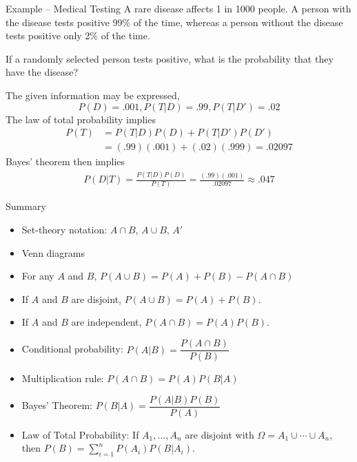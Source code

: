 \documentclass[xcolor=table]{beamer}
\begin{document}
\begin{frame}{Example -- Medical Testing}
A rare disease affects 1 in 1000 people. A person with the disease tests positive 99\% of the time, whereas a person without the disease tests positive only 2\% of the time.
\begin{problem}
If a randomly selected person tests positive, what is the probability that they have the disease?
\end{problem}
\pause The given information may be expressed,
$$P(D) = .001, P(T|D)=.99, P(T|D')=.02$$
The law of total probability implies
\begin{align*}
P(T) &= P(T|D)P(D)+P(T|D')P(D') \\
&= (.99)(.001)+(.02)(.999) = .02097
\end{align*}
Bayes' theorem then implies
\begin{align*}
P(D|T) = \frac{P(T|D)P(D)}{P(T)}
= \frac{(.99)(.001)}{.02097} \approx .047
\end{align*}
\end{frame}

\begin{frame}{Summary}
\begin{itemize}
\item Set-theory notation: $A \cap B$, $A \cup B$, $A'$
\item Venn diagrams
\item For any $A$ and $B$, $P(A\cup B)=P(A)+P(B)-P(A\cap B)$
\vspace{.1in}
\item If $A$ and $B$ are disjoint, $P(A \cup B)=P(A)+P(B)$.
\vspace{.1in}
\item If $A$ and $B$ are independent, $P(A\cap B)=P(A)P(B)$.
\vspace{.1in}
\item Conditional probability: $P(A|B) = \dfrac{P(A\cap B)}{P(B)}$
\vspace{.1in}
\item Multiplication rule: $P(A \cap B)=P(A)P(B|A)$
\vspace{.1in}
\item Bayes' Theorem: $P(B|A) = \dfrac{P(A|B)P(B)}{P(A)}$
\vspace{.1in}
\item Law of Total Probability: If $A_1,\dots,A_n$ are disjoint with $\Omega=A_1\cup\cdots\cup A_n$,
then $P(B)=\sum_{i=1}^n P(A_i)P(B|A_i)$.

\end{itemize}
\end{frame}

\end{document}
